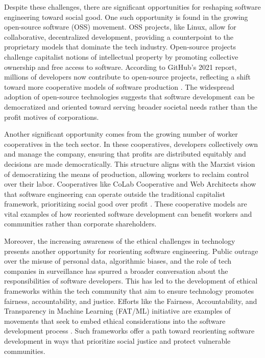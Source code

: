 \begin{refsection}
Despite these challenges, there are significant opportunities for reshaping software engineering toward social good. One such opportunity is found in the growing open-source software (OSS) movement. OSS projects, like Linux, allow for collaborative, decentralized development, providing a counterpoint to the proprietary models that dominate the tech industry. Open-source projects challenge capitalist notions of intellectual property by promoting collective ownership and free access to software. According to GitHub’s 2021 report, millions of developers now contribute to open-source projects, reflecting a shift toward more cooperative models of software production \cite[pp.~3-4]{github2021}. The widespread adoption of open-source technologies suggests that software development can be democratized and oriented toward serving broader societal needs rather than the profit motives of corporations.

Another significant opportunity comes from the growing number of worker cooperatives in the tech sector. In these cooperatives, developers collectively own and manage the company, ensuring that profits are distributed equitably and decisions are made democratically. This structure aligns with the Marxist vision of democratizing the means of production, allowing workers to reclaim control over their labor. Cooperatives like CoLab Cooperative and Web Architects show that software engineering can operate outside the traditional capitalist framework, prioritizing social good over profit \cite[pp.~133-135]{scholz2017}. These cooperative models are vital examples of how reoriented software development can benefit workers and communities rather than corporate shareholders.

Moreover, the increasing awareness of the ethical challenges in technology presents another opportunity for reorienting software engineering. Public outrage over the misuse of personal data, algorithmic biases, and the role of tech companies in surveillance has spurred a broader conversation about the responsibilities of software developers. This has led to the development of ethical frameworks within the tech community that aim to ensure technology promotes fairness, accountability, and justice. Efforts like the Fairness, Accountability, and Transparency in Machine Learning (FAT/ML) initiative are examples of movements that seek to embed ethical considerations into the software development process \cite[pp.~11-13]{barocas2019}. Such frameworks offer a path toward reorienting software development in ways that prioritize social justice and protect vulnerable communities.


\end{refsection}
